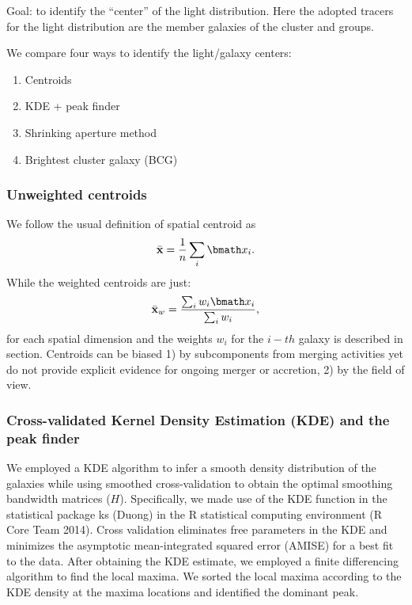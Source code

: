 \documentclass[usenatbib]{mn2e}
\renewcommand{\vec}[1]{ {\bmath #1} }
\begin{document}
Goal: to identify the ``center'' of the light distribution. Here the adopted tracers for the light distribution are the member galaxies of the cluster and groups.

We compare four ways to identify the light/galaxy centers:
\begin{enumerate}
\item Centroids
\item KDE + peak finder
\item Shrinking aperture method
\item Brightest cluster galaxy (BCG)

\end{enumerate}

\subsubsection{Unweighted centroids}
We follow the usual definition of spatial centroid as 
\begin{equation}
	\bar{\bf x} = \frac{1}{n} \sum_i \vec{x}_i. 
\end{equation}
While the weighted centroids are just: 
\begin{equation}
	\bar{\bf x}_w = \frac{\sum_i w_i \vec{x}_i}{\sum_i w_i},
\end{equation}
for each spatial dimension and the weights $w_i$ for the $i-th$ galaxy
is described in section.
Centroids can be biased 1) by subcomponents from merging activities yet do
not provide explicit evidence for ongoing merger or accretion, 2) by the 
field of view.

\subsubsection{Cross-validated Kernel Density Estimation (KDE) and the peak finder} 
We employed a KDE algorithm to infer a smooth density distribution of the
galaxies while using smoothed cross-validation to obtain the optimal smoothing
bandwidth matrices ($H$). Specifically, we made use of the KDE function in
the statistical package ks (Duong) in the R statistical computing environment (R Core Team 2014).
Cross validation eliminates free parameters in the KDE and minimizes
the asymptotic mean-integrated squared error (AMISE) for a best fit to the
data.
After obtaining the KDE estimate, we employed a finite differencing algorithm
to find the local maxima. We sorted the local maxima according to the KDE
density at the maxima locations and identified the dominant peak. 
\end{document}
